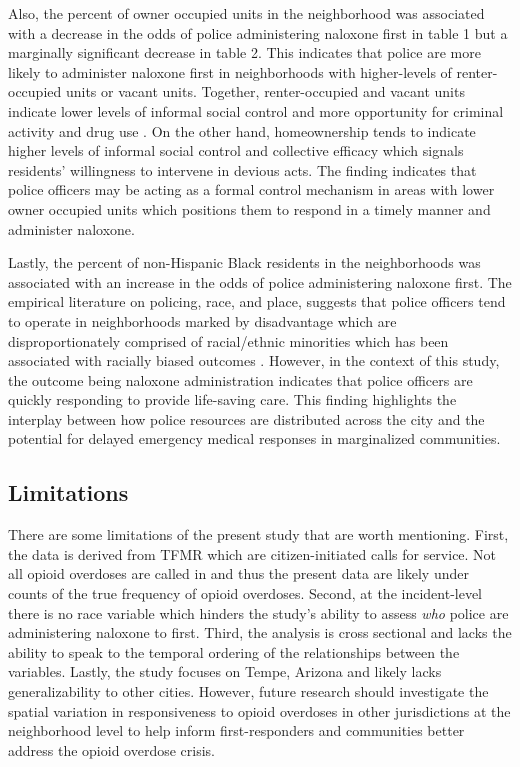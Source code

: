 Also, the percent of owner occupied units in the neighborhood was associated with a decrease in the odds of police administering naloxone first in table 1 but a marginally significant decrease in table 2. This indicates that police are more likely to administer naloxone first in neighborhoods with higher-levels of renter-occupied units or vacant units. Together, renter-occupied and vacant units indicate lower levels of informal social control and more opportunity for criminal activity and drug use \parencite{feldmeyer_community_2022, hannon_neighborhood_2006}. On the other hand, homeownership tends to indicate higher levels of informal social control and collective efficacy \parencite{sampson_neighborhoods_1997} which signals residents' willingness to intervene in devious acts. The finding indicates that police officers may be acting as a formal control mechanism in areas with lower owner occupied units which positions them to respond in a timely manner and administer naloxone.

Lastly, the percent of non-Hispanic Black residents in the neighborhoods was associated with an increase in the odds of police administering naloxone first. The empirical literature on policing, race, and place, suggests that police officers tend to operate in neighborhoods marked by disadvantage which are disproportionately comprised of racial/ethnic minorities which has been associated with racially biased outcomes \parencite{fagan_street_2000}. However, in the context of this study, the outcome being naloxone administration indicates that police officers are quickly responding to provide life-saving care. This finding highlights the interplay between how police resources are distributed across the city and the potential for delayed emergency medical responses in marginalized communities. 

\subsection{Limitations}
There are some limitations of the present study that are worth mentioning. First, the data is derived from TFMR which are citizen-initiated calls for service. Not all opioid overdoses are called in and thus the present data are likely under counts of the true frequency of opioid overdoses. Second, at the incident-level there is no race variable which hinders the study's ability to assess \textit{who} police are administering naloxone to first. Third, the analysis is cross sectional and lacks the ability to speak to the temporal ordering of the relationships between the variables. Lastly, the study focuses on Tempe, Arizona and likely lacks generalizability to other cities. However, future research should investigate the spatial variation in responsiveness to opioid overdoses in other jurisdictions at the neighborhood level to help inform first-responders and communities better address the opioid overdose crisis.

